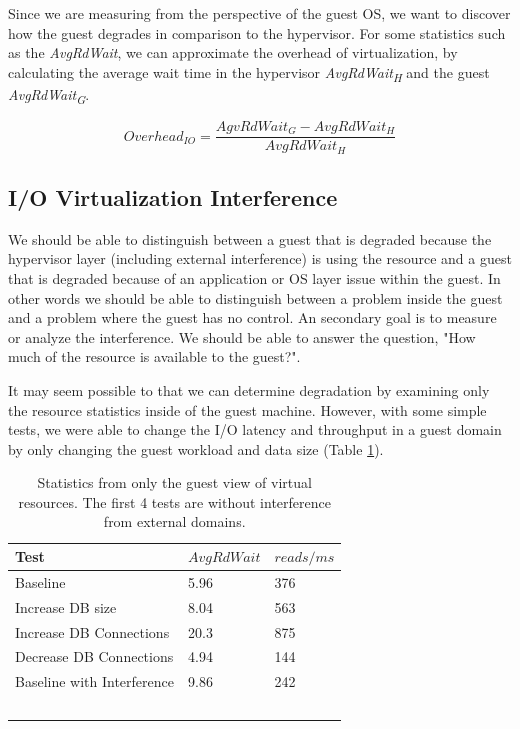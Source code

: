 Since we are measuring from the perspective of the guest OS, we want to discover how the guest degrades in comparison to the hypervisor.  
For some statistics such as the \emph{AvgRdWait}, we can approximate the overhead of virtualization, by calculating the average wait time in the hypervisor \emph{AvgRdWait\textsubscript{H}} and the guest \emph{AvgRdWait\textsubscript{G}}.

\begin{equation}
  Overhead_{IO} = \frac{AgvRdWait_G - AvgRdWait_H}{AvgRdWait_H} 
\end{equation}

\subsection{I/O Virtualization Interference}
We should be able to distinguish between a guest that is degraded because the hypervisor layer (including external interference) is using the resource and a guest that is degraded because of an application or OS layer issue within the guest.  In other words we should be able to distinguish between a problem inside the guest and a problem where the guest has no control.  An secondary goal is to measure or analyze the interference.  We should be able to answer the question, "How much of the resource is available to the guest?".

It may seem possible to that we can determine degradation by examining only the resource statistics inside of the guest machine.  However, with some simple tests, we were able to change the I/O latency and throughput in a guest domain by only changing the guest workload and data size (Table \ref{tab:guestOnly}).
 
\begin{table}[h]
  \begin{tabular}{ l l p{5cm} }
    Test & $AvgRdWait$ & $reads/ms$  \\
    \hline
    Baseline                     & 5.96 & 376 \\   %
    Increase DB size             & 8.04 & 563 \\   %
    Increase DB Connections      & 20.3 & 875 \\   %
    Decrease DB Connections      & 4.94 & 144 \\   %
    Baseline with Interference   & 9.86 & 242 \\   %
    \hline
  \end{tabular}
\caption{Statistics from only the guest view of virtual resources.  The first 4 tests are without interference from external domains. }
\label{tab:guestOnly}
\end{table}

